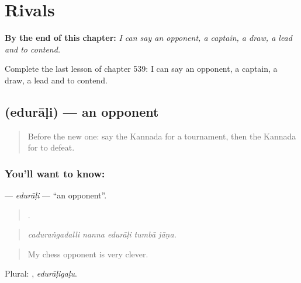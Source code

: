 
\chapter{Rivals}
\label{ch:ka-rivals}

\begin{chapteropening}
\textbf{By the end of this chapter:} \emph{I can say an opponent, a captain, a draw, a lead and to contend.}

Complete the last lesson of chapter 539: I can say an opponent, a captain, a draw, a lead and to contend.
\end{chapteropening}

\section[\texorpdfstring{\kn{ಎದುರಾಳಿ} (edurāḷi)}{ಎದುರಾಳಿ (edurāḷi)}]{ (edurāḷi) — an opponent}

\label{lesson:KA-C539-edurali}



\begin{quote}
Before the new one: say the Kannada for a tournament, then the Kannada for to defeat.
\end{quote}

\subsection*{You'll want to know: }
\textbf{} — \emph{edurāḷi} — \textquotedblleft{}an opponent\textquotedblright{}.

\begin{quote}
    .
\end{quote}

\begin{quote}
\emph{caduraṅgadalli nanna edurāḷi tumbā jāṇa.}
\end{quote}

\begin{quote}
My chess opponent is very clever.
\end{quote}

Plural: , \emph{edurāḷigaḷu}.

